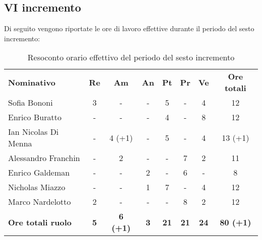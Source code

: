 \documentclass[../piano-di-progetto.tex]{subfiles}
\begin{document}
\subsection{VI incremento}

Di seguito vengono riportate le ore di lavoro effettive durante il periodo del sesto incremento:
\begin{table}[H]
    \centering
    \begin{tabular}{lccccccc}
      \rowcolor{lightgray}
      \textbf{Nominativo}       & \textbf{Re}      & \textbf{Am} & \textbf{An}      & \textbf{Pt} & \textbf{Pr} & \textbf{Ve} & \textbf{Ore totali} \\
Sofia Bononi              & 3          & -               & -          & 5           & -           & 4           & 12               \\
Enrico Buratto            & -          & -               & -          & 4           & -           & 8           & 12               \\
Ian Nicolas Di Menna      & -          & 4 (+1)          & -          & 5           & -           & 4           & 13 (+1)          \\
Alessandro Franchin       & -          & 2               & -          & -           & 7           & 2           & 11               \\
Enrico Galdeman           & -          & -               & 2          & -           & 6           & -           & 8                \\
Nicholas Miazzo           & -          & -               & 1          & 7           & -           & 4           & 12               \\
Marco Nardelotto          & 2          & -               & -          & -           & 8           & 2           & 12               \\
\textbf{Ore totali ruolo} & \textbf{5} & \textbf{6 (+1)} & \textbf{3} & \textbf{21} & \textbf{21} & \textbf{24} & \textbf{80 (+1)}

    \end{tabular}
    \caption{Resoconto orario effettivo del periodo del sesto incremento}
  \end{table}
\end{document}

